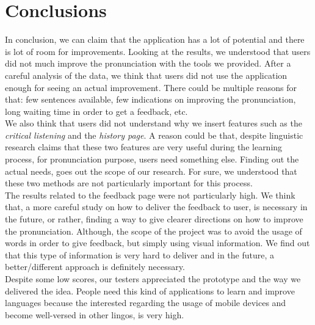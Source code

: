 \chapter{Conclusions}
\label{chap:Conclusions}

In conclusion, we can claim that the application has a lot of potential and there is lot of room for improvements. Looking at the results, we understood that users did not much improve the pronunciation with the tools we provided. After a careful analysis of the data, we think that users did not use the application enough for seeing an actual improvement. There could be multiple reasons for that: few sentences available, few indications on improving the pronunciation, long waiting time in order to get a feedback, etc. \\
\noindent We also think that users did not understand why we insert features such as the \textit{critical listening} and the \textit{history page}. A reason could be that, despite linguistic research claims that these two features are very useful during the learning process, for pronunciation purpose, users need something else. Finding out the actual needs, goes out the scope of our research. For sure, we understood that these two methods are not particularly important for this process. \\
\noindent The results related to the feedback page were not particularly high. We think that, a more careful study on how to deliver the feedback to user, is necessary in the future, or rather, finding a way to give clearer directions on how to improve the pronunciation. Although, the scope of the project was to avoid the usage of words in order to give feedback, but simply using visual information. We find out that this type of information is very hard to deliver and in the future, a better/different approach is definitely necessary. \\

\noindent Despite some low scores, our testers appreciated the prototype and the way we delivered the idea. People need this kind of applications to learn and improve languages because the interested regarding the usage of mobile devices and become well-versed in other lingos, is very high.
